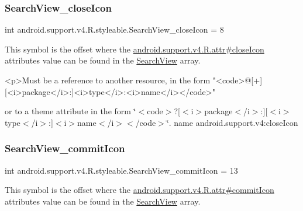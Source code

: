 \subsubsection{\texorpdfstring{Search\+View\+\_\+close\+Icon}{SearchView\_closeIcon}}
{\footnotesize\ttfamily int android.\+support.\+v4.\+R.\+styleable.\+Search\+View\+\_\+close\+Icon = 8\hspace{0.3cm}{\ttfamily [static]}}

This symbol is the offset where the \hyperlink{classandroid_1_1support_1_1v4_1_1R_1_1attr_af7159ba49dfc915e970744102e5910fe}{android.\+support.\+v4.\+R.\+attr\#close\+Icon} attribute\textquotesingle{}s value can be found in the \hyperlink{classandroid_1_1support_1_1v4_1_1R_1_1styleable_a7f709410d566e9fd5d4c710e815c300a}{Search\+View} array.

\begin{DoxyVerb}      <p>Must be a reference to another resource, in the form "<code>@[+][<i>package</i>:]<i>type</i>:<i>name</i></code>"
\end{DoxyVerb}
 or to a theme attribute in the form \char`\"{}$<$code$>$?\mbox{[}$<$i$>$package$<$/i$>$\+:\mbox{]}\mbox{[}$<$i$>$type$<$/i$>$\+:\mbox{]}$<$i$>$name$<$/i$>$$<$/code$>$\char`\"{}.  name android.\+support.\+v4\+:close\+Icon \mbox{\label{classandroid_1_1support_1_1v4_1_1R_1_1styleable_a249a336fa30e7f77fa15e369b5db4e59}} 
\subsubsection{\texorpdfstring{Search\+View\+\_\+commit\+Icon}{SearchView\_commitIcon}}
{\footnotesize\ttfamily int android.\+support.\+v4.\+R.\+styleable.\+Search\+View\+\_\+commit\+Icon = 13\hspace{0.3cm}{\ttfamily [static]}}

This symbol is the offset where the \hyperlink{classandroid_1_1support_1_1v4_1_1R_1_1attr_aaaa25c2285a9f33ef704eaed37165397}{android.\+support.\+v4.\+R.\+attr\#commit\+Icon} attribute\textquotesingle{}s value can be found in the \hyperlink{classandroid_1_1support_1_1v4_1_1R_1_1styleable_a7f709410d566e9fd5d4c710e815c300a}{Search\+View} array.

